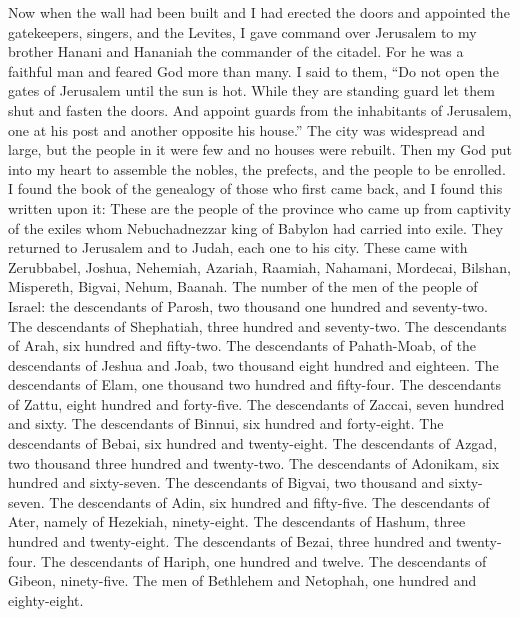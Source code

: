 \begin{biblechapter} %
\verse Now when the wall had been built and I had erected the doors and appointed the gatekeepers, singers, and the Levites,
\verse I gave command over Jerusalem to my brother Hanani and Hananiah the commander of the citadel. For he was a faithful man and feared God more than many.
\verse I said to them, “Do not open the gates of Jerusalem until the sun is hot. While they are standing guard let them shut and fasten the doors. And appoint guards from the inhabitants of Jerusalem, one at his post and another opposite his house.”
\verse The city was widespread and large, but the people in it were few and no houses were rebuilt.
 Then my God put into my heart to assemble the nobles, the prefects, and the people to be enrolled. I found the book of the genealogy of those who first came back, and I found this written upon it:
\verse These are the people of the province who came up from captivity of the exiles whom Nebuchadnezzar king of Babylon had carried into exile. They returned to Jerusalem and to Judah, each one to his city.
\verse These came with Zerubbabel, Joshua, Nehemiah, Azariah, Raamiah, Nahamani, Mordecai, Bilshan, Mispereth, Bigvai, Nehum, Baanah.
\verse The number of the men of the people of Israel:
\verse the descendants of Parosh, two thousand one hundred and seventy-two.
\verse The descendants of Shephatiah, three hundred and seventy-two.
\verse The descendants of Arah, six hundred and fifty-two.
\verse The descendants of Pahath-Moab, of the descendants of Jeshua and Joab, two thousand eight hundred and eighteen.
\verse The descendants of Elam, one thousand two hundred and fifty-four.
\verse The descendants of Zattu, eight hundred and forty-five.
\verse The descendants of Zaccai, seven hundred and sixty.
\verse The descendants of Binnui, six hundred and forty-eight.
\verse The descendants of Bebai, six hundred and twenty-eight.
\verse The descendants of Azgad, two thousand three hundred and twenty-two.
\verse The descendants of Adonikam, six hundred and sixty-seven.
\verse The descendants of Bigvai, two thousand and sixty-seven.
\verse The descendants of Adin, six hundred and fifty-five.
\verse The descendants of Ater, namely of Hezekiah, ninety-eight.
\verse The descendants of Hashum, three hundred and twenty-eight.
\verse The descendants of Bezai, three hundred and twenty-four.
\verse The descendants of Hariph, one hundred and twelve.
\verse The descendants of Gibeon, ninety-five.
\verse The men of Bethlehem and Netophah, one hundred and eighty-eight.

\end{biblechapter}
